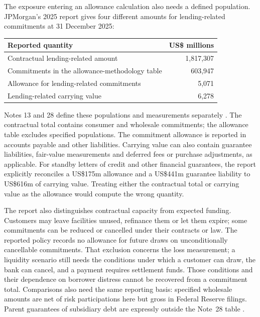 The exposure entering an allowance calculation also needs a defined
population. JPMorgan's 2025 report gives four different amounts for
lending-related commitments at 31 December 2025:
\begin{center}
\begin{tabularx}{\linewidth}{@{}Xr@{}}
\toprule
Reported quantity & US\$ millions \\
\midrule
Contractual lending-related amount & 1,817,307 \\
Commitments in the allowance-methodology table & 603,947 \\
Allowance for lending-related commitments & 5,071 \\
Lending-related carrying value & 6,278 \\
\bottomrule
\end{tabularx}
\end{center}
Notes 13 and 28 define these populations and measurements separately
\citep[pp.~258--262, 295--297]{jpmorgan2025tenk}. The contractual total
contains consumer and wholesale commitments; the allowance table excludes
specified populations. The commitment allowance is reported in accounts
payable and other liabilities. Carrying value can also contain guarantee
liabilities, fair-value measurements and deferred fees or purchase adjustments,
as applicable. For standby letters of credit and other financial guarantees,
the report explicitly reconciles a US\$175m allowance and a US\$441m guarantee
liability to US\$616m of carrying value. Treating either the contractual total
or carrying value as the allowance would compute the wrong quantity.

The report also distinguishes contractual capacity from expected funding.
Customers may leave facilities unused, refinance them or let them expire;
some commitments can be reduced or cancelled under their contracts or law.
The reported policy records no allowance for future draws on unconditionally
cancellable commitments. That exclusion concerns the loss measurement;
a liquidity scenario still needs the conditions under which a customer can
draw, the bank can cancel, and a payment requires settlement funds. Those
conditions and their dependence on borrower distress cannot be recovered
from a commitment total. Comparisons also need the same reporting basis:
specified wholesale amounts are net of risk participations here but gross
in Federal Reserve filings. Parent guarantees of subsidiary debt are
expressly outside the Note~28 table
\citep[pp.~258, 295--296, 300]{jpmorgan2025tenk}.

